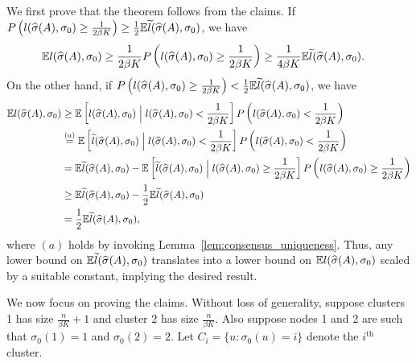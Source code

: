 \documentclass{article}
\begin{document}
\noindent We first prove that the theorem follows from the claims. If $P\left( l(\widehat{\sigma}(A), \sigma_0) \geq \frac{1}{2\beta K} \right) \geq \frac{1}{2} {\mathbb E} \widetilde{l}(\widehat{\sigma}(A), \sigma_0)$, we have
\begin{align*}
{\mathbb E} l(\widehat{\sigma}(A), \sigma_0) &\geq \frac{1}{2 \beta K} P\left( l(\widehat{\sigma}(A), \sigma_0) \geq \frac{1}{2\beta K} \right) \geq \frac{1}{4 \beta K}  {\mathbb E} \widetilde{l}(\widehat{\sigma}(A), \sigma_0).
\end{align*}
On the other hand, if $P\left( l(\widehat{\sigma}(A), \sigma_0) \geq \frac{1}{2\beta K} \right) < \frac{1}{2} {\mathbb E} \widetilde{l}(\widehat{\sigma}(A), \sigma_0)$, we have
\begin{align*}
{\mathbb E} l(\widehat{\sigma}(A), \sigma_0) &\geq {\mathbb E}\left[ l(\widehat{\sigma}(A), \sigma_0) 
       \; \Big | \; l(\widehat{\sigma}(A), \sigma_0) < \frac{1}{2 \beta K} \right] 
         P\left(  l(\widehat{\sigma}(A), \sigma_0) < \frac{1}{2 \beta K} \right) \\
  & \stackrel{(a)}{=} {\mathbb E}\left[ \widetilde{l}(\widehat{\sigma}(A), \sigma_0) 
       \; \Big | \; l(\widehat{\sigma}(A), \sigma_0) < \frac{1}{2 \beta K}\right]
         P\left(  l(\widehat{\sigma}(A), \sigma_0) < \frac{1}{2 \beta K} \right) \\
  &= {\mathbb E} \widetilde{l}(\widehat{\sigma}(A), \sigma_0) -  
      {\mathbb E}\left[ \widetilde{l}(\widehat{\sigma}(A), \sigma_0) 
       \; \Big | \; l(\widehat{\sigma}(A), \sigma_0) \geq \frac{1}{2 \beta K} \right] 
         P\left(  l(\widehat{\sigma}(A), \sigma_0) \geq \frac{1}{2 \beta K} \right) \\
  &\geq {\mathbb E} \widetilde{l}(\widehat{\sigma}(A), \sigma_0) - \frac{1}{2}  {\mathbb E} \widetilde{l}(\widehat{\sigma}(A), \sigma_0) \\
  &= \frac{1}{2}  {\mathbb E} \widetilde{l}(\widehat{\sigma}(A), \sigma_0),
\end{align*}
where $(a)$ holds by invoking Lemma~\ref{lem:consensus_uniqueness}.
Thus, any lower bound on ${\mathbb E} \widetilde l(\widehat \sigma(A), \sigma_0)$ translates into a lower bound on ${\mathbb E} l(\widehat \sigma(A), \sigma_0)$ scaled by a suitable constant, implying the desired result.

We now focus on proving the claims. Without loss of generality, suppose clusters 1 has size $\frac{n}{\beta K} + 1$ and cluster 2 has size $\frac{n}{\beta K}$. Also suppose nodes 1 and 2 are such that $\sigma_0(1)= 1$ and $\sigma_0(2) = 2$. Let $C_i = \{u : \sigma_0(u) = i\}$ denote the $i^\text{th}$ cluster.
\end{document}
